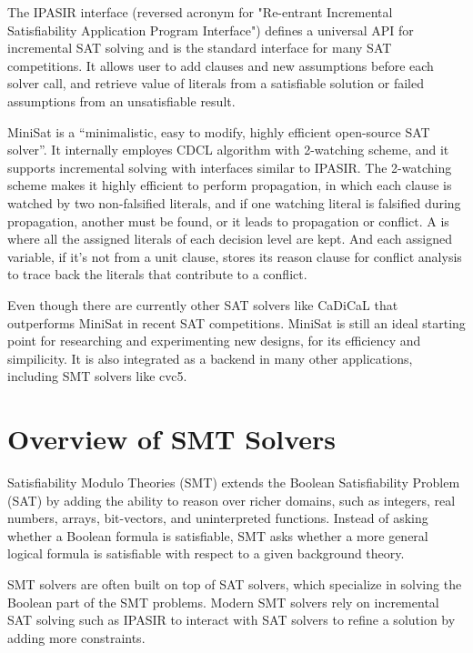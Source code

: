 The IPASIR interface (reversed acronym for "Re-entrant Incremental Satisfiability Application Program Interface") defines a universal API for incremental SAT solving and is the standard interface for many SAT competitions. \cite{BALYO201645} It allows user to add clauses and new assumptions before each solver call, and retrieve value of literals from a satisfiable solution or failed assumptions from an unsatisfiable result.

MiniSat is a ``minimalistic, easy to modify, highly efficient open-source SAT solver''. It internally employes CDCL algorithm with 2-watching scheme, and it supports incremental solving with interfaces similar to IPASIR. The 2-watching scheme makes it highly efficient to perform propagation, in which each clause is watched by two non-falsified literals, and if one watching literal is falsified during propagation, another must be found, or it leads to propagation or conflict. A  is where all the assigned literals of each decision level are kept. And each assigned variable, if it's not from a unit clause, stores its reason clause for conflict analysis to trace back the literals that contribute to a conflict.

Even though there are currently other SAT solvers like CaDiCaL that outperforms MiniSat in recent SAT competitions. MiniSat is still an ideal starting point for researching and experimenting new designs, for its efficiency and simpilicity. It is also integrated as a backend in many other applications, including SMT solvers like cvc5.

\section{Overview of SMT Solvers}

Satisfiability Modulo Theories (SMT) extends the Boolean Satisfiability Problem (SAT) by adding the ability to reason over richer domains, such as integers, real numbers, arrays, bit-vectors, and uninterpreted functions. Instead of asking whether a Boolean formula is satisfiable, SMT asks whether a more general logical formula is satisfiable with respect to a given background theory.

SMT solvers are often built on top of SAT solvers, which specialize in solving the Boolean part of the SMT problems. Modern SMT solvers rely on incremental SAT solving such as IPASIR to interact with SAT solvers to refine a solution by adding more constraints.

